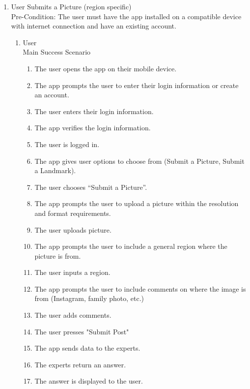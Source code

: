 \documentclass[]{article}
\begin{document}
\begin{enumerate}[{\bf BE1.}]
	\item User Submits a Picture (region specific)
        \\ Pre-Condition: The user must have the app installed on a compatible device with internet connection and have an existing account. 
		\begin{enumerate}[{\bf VP1.}]
			\item User \\
				Main Success Scenario
                    \begin{enumerate}[{1.}]
                        \item The user opens the app on their mobile device.
                        \item The app prompts the user to enter their login information or create an account.
                        \item The user enters their login information.
                        \item The app verifies the login information.
                        \item The user is logged in.
                        \item The app gives user options to choose from (Submit a Picture, Submit a Landmark). 
                        \item The user chooses “Submit a Picture”. 
                        \item The app prompts the user to upload a picture within the resolution and format requirements.
                        \item The user uploads picture.
                        \item The app prompts the user to include a general region where the picture is from. 
                        \item The user inputs a region. 
                        \item The app prompts the user to include comments on where the image is from (Instagram, family photo, etc.) 
                        \item The user adds comments.
                        \item The user presses "Submit Post"
                        \item The app sends data to the experts.
                        \item The experts return an answer. 
                        \item The answer is displayed to the user. \\
                    \end{enumerate}
                    

\end{enumerate}
\end{enumerate}
\end{document}
